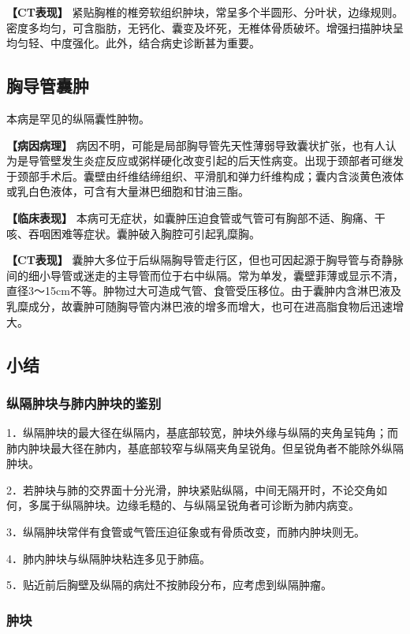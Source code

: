 \textbf{【CT表现】}
紧贴胸椎的椎旁软组织肿块，常呈多个半圆形、分叶状，边缘规则。密度多均匀，可含脂肪，无钙化、囊变及坏死，无椎体骨质破坏。增强扫描肿块呈均匀轻、中度强化。此外，结合病史诊断甚为重要。

\subsection{胸导管囊肿}

本病是罕见的纵隔囊性肿物。

\textbf{【病因病理】}
病因不明，可能是局部胸导管先天性薄弱导致囊状扩张，也有人认为是导管壁发生炎症反应或粥样硬化改变引起的后天性病变。出现于颈部者可继发于颈部手术后。囊壁由纤维结缔组织、平滑肌和弹力纤维构成；囊内含淡黄色液体或乳白色液体，可含有大量淋巴细胞和甘油三酯。

\textbf{【临床表现】}
本病可无症状，如囊肿压迫食管或气管可有胸部不适、胸痛、干咳、吞咽困难等症状。囊肿破入胸腔可引起乳糜胸。

\textbf{【CT表现】}
囊肿大多位于后纵隔胸导管走行区，但也可因起源于胸导管与奇静脉间的细小导管或迷走的主导管而位于右中纵隔。常为单发，囊壁菲薄或显示不清，直径3～15cm不等。肿物过大可造成气管、食管受压移位。由于囊肿内含淋巴液及乳糜成分，故囊肿可随胸导管内淋巴液的增多而增大，也可在进高脂食物后迅速增大。

\subsection{小结}

\subsubsection{纵隔肿块与肺内肿块的鉴别}

1．纵隔肿块的最大径在纵隔内，基底部较宽，肿块外缘与纵隔的夹角呈钝角；而肺内肿块最大径在肺内，基底部较窄与纵隔夹角呈锐角。但呈锐角者不能除外纵隔肿块。

2．若肿块与肺的交界面十分光滑，肿块紧贴纵隔，中间无隔开时，不论交角如何，多属于纵隔肿块。边缘毛糙的、与纵隔呈锐角者可诊断为肺内病变。

3．纵隔肿块常伴有食管或气管压迫征象或有骨质改变，而肺内肿块则无。

4．肺内肿块与纵隔肿块粘连多见于肺癌。

5．贴近前后胸壁及纵隔的病灶不按肺段分布，应考虑到纵隔肿瘤。

\subsubsection{肿块}

